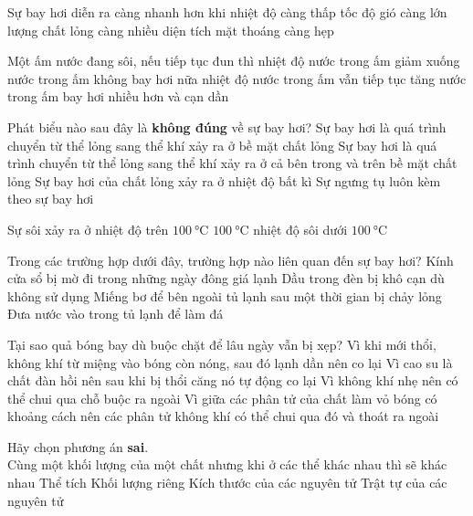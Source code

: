 \begin{ex}
Sự bay hơi diễn ra càng nhanh hơn khi
\choice
{ nhiệt độ càng thấp}
{\True tốc độ gió càng lớn}
{ lượng chất lỏng càng nhiều}
{ diện tích mặt thoáng càng hẹp}
\end{ex}
\begin{ex}
Một ấm nước đang sôi, nếu tiếp tục đun thì
\choice
{ nhiệt độ nước trong ấm giảm xuống}
{ nước trong ấm không bay hơi nữa}
{ nhiệt độ nước trong ấm vẫn tiếp tục tăng}
{\True nước trong ấm bay hơi nhiều hơn và cạn dần}
\end{ex}
\begin{ex}
Phát biểu nào sau đây là \textbf{không đúng} về sự bay hơi?
\choice
{ Sự bay hơi là quá trình chuyển từ thể lỏng sang thể khí xảy ra ở bề mặt chất lỏng}
{\True Sự bay hơi là quá trình chuyển từ thể lỏng sang thể khí xảy ra ở cả bên trong và trên bề mặt chất lỏng}
{ Sự bay hơi của chất lỏng xảy ra ở nhiệt độ bất kì}
{ Sự ngưng tụ luôn kèm theo sự bay hơi}
\end{ex}
\begin{ex}
Sự sôi xảy ra ở
\choice
{ nhiệt độ trên $\SI{100}{\celsius}$}
{ $\SI{100}{\celsius}$}
{\True nhiệt độ sôi}
{ dưới $\SI{100}{\celsius}$}
\end{ex}
\begin{ex}
Trong các trường hợp dưới đây, trường hợp nào liên quan đến sự bay hơi?
\choice
{ Kính cửa sổ bị mờ đi trong những ngày đông giá lạnh}
{\True Dầu trong đèn bị khô cạn dù không sử dụng}
{ Miếng bơ để bên ngoài tủ lạnh sau một thời gian bị chảy lỏng}
{ Đưa nước vào trong tủ lạnh để làm đá}
\end{ex}
\begin{ex}
Tại sao quả bóng bay dù buộc chặt để lâu ngày vẫn bị xẹp?
\choice
{ Vì khi mới thổi, không khí từ miệng vào bóng còn nóng, sau đó lạnh dần nên co lại}
{ Vì cao su là chất đàn hồi nên sau khi bị thổi căng nó tự động co lại}
{ Vì không khí nhẹ nên có thể chui qua chỗ buộc ra ngoài}
{\True Vì giữa các phân tử của chất làm vỏ bóng có khoảng cách nên các phân tử không khí có thể chui qua đó và thoát ra ngoài}
\end{ex}
\begin{ex}
Hãy chọn phương án \textbf{sai}.\\
Cùng một khối lượng của một chất nhưng khi ở các thể khác nhau thì sẽ khác nhau
\choice
{ Thể tích}
{ Khối lượng riêng}
{\True Kích thước của các nguyên tử}
{ Trật tự của các nguyên tử}
\end{ex}
